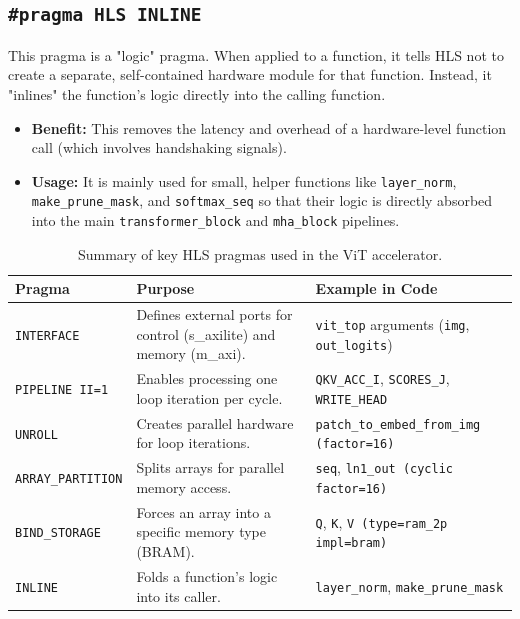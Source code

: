\subsection{\texttt{\#pragma HLS INLINE}}
This pragma is a "logic" pragma. When applied to a function, it tells HLS not to create a separate, self-contained hardware module for that function. Instead, it "inlines" the function's logic directly into the calling function.
\begin{itemize}
    \item \textbf{Benefit:} This removes the latency and overhead of a hardware-level function call (which involves handshaking signals).
    \item \textbf{Usage:} It is mainly used for small, helper functions like \texttt{layer\_norm}, \texttt{make\_prune\_mask}, and \texttt{softmax\_seq} so that their logic is directly absorbed into the main \texttt{transformer\_block} and \texttt{mha\_block} pipelines.
\end{itemize}
\begin{table}[H]
\centering
    \renewcommand{\arraystretch}{1.25}
    \begin{tabularx}{\textwidth}{|>{\raggedright\arraybackslash}p{2.8cm}|>{\raggedright\arraybackslash}p{4cm}|>{\raggedright\arraybackslash}X|}
        \hline
        \textbf{Pragma} & \textbf{Purpose} & \textbf{Example in Code} \\
        \hline
        \texttt{INTERFACE} & Defines external ports for control (s\_axilite) and memory (m\_axi). & \texttt{vit\_top} arguments (\texttt{img}, \texttt{out\_logits}) \\
        \hline
        \texttt{PIPELINE II=1} & Enables processing one loop iteration per cycle. & \texttt{QKV\_ACC\_I}, \texttt{SCORES\_J}, \texttt{WRITE\_HEAD} \\
        \hline
        \texttt{UNROLL} & Creates parallel hardware for loop iterations. & \texttt{patch\_to\_embed\_from\_img (factor=16)} \\
        \hline
        \hline
        \texttt{ARRAY\_PARTITION} & Splits arrays for parallel memory access. & \texttt{seq}, \texttt{ln1\_out (cyclic factor=16)} \\
        \hline
        \texttt{BIND\_STORAGE} & Forces an array into a specific memory type (BRAM). & \texttt{Q}, \texttt{K}, \texttt{V (type=ram\_2p impl=bram)} \\
        \hline
        \texttt{INLINE} & Folds a function's logic into its caller. & \texttt{layer\_norm}, \texttt{make\_prune\_mask} \\
        \hline
    \end{tabularx}
    \caption{Summary of key HLS pragmas used in the ViT accelerator.}
    \label{table:pragma_summary}
\end{table}


